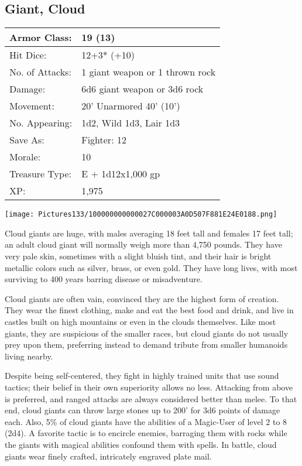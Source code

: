 \documentclass[a4paper,twoside,openany,10pt]{book}
\begin{document}
\begin{multicols}{2}
	



\subsection*{Giant, Cloud}\label{giant-cloud}

\begin{tabularx}{0.48\textwidth}{@{}lX@{}}
Armor Class: & 19 (13) \\\hline
Hit Dice: & 12+3* (+10) \\\hline
No. of Attacks: & 1 giant weapon or 1 thrown rock \\\hline
Damage: & 6d6 giant weapon or 3d6 rock \\\hline
Movement: & 20' Unarmored 40'
(10') \\\hline
No. Appearing: & 1d2, Wild 1d3, Lair 1d3 \\\hline
Save As: & Fighter: 12 \\\hline
Morale: & 10 \\\hline
Treasure Type: & E + 1d12x1,000 gp \\\hline
XP: & 1,975 \\\hline
\end{tabularx}\medskip


\begin{center}
	\texttt{[image: Pictures133/100000000000027C000003A0D507F881E24E0188.png]}
\end{center}

Cloud giants are huge, with males averaging 18 feet tall and females 17 feet tall; an adult cloud giant will normally weigh more than 4,750 pounds. They have very pale skin, sometimes with a slight bluish tint, and their hair is bright metallic colors such as silver, brass, or even gold. They have long lives, with most surviving to 400 years barring disease or misadventure.

Cloud giants are often vain, convinced they are the highest form of creation. They wear the finest clothing, make and eat the best food and drink, and live in castles built on high mountains or even in the clouds themselves. Like most giants, they are suspicious of the smaller races, but cloud giants do not usually prey upon them, preferring instead to demand tribute from smaller humanoids living nearby.

Despite being self-centered, they fight in highly trained units that use sound tactics; their belief in their own superiority allows no less. Attacking from above is preferred, and ranged attacks are always considered better than melee. To that end, cloud giants can throw large stones up to 200' for 3d6 points of damage each. Also, 5\% of cloud giants have the abilities of a Magic-User of level 2 to 8 (2d4). A favorite tactic is to encircle enemies, barraging them with rocks while the giants with magical abilities confound them with spells. In battle, cloud giants wear finely crafted, intricately engraved plate mail.



\end{multicols}
\end{document}
